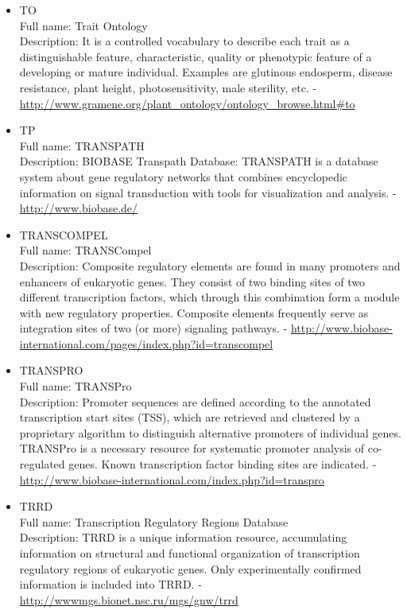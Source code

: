 \begin{itemize}
\item{TO}\\ Full name: Trait Ontology\\ Description: It is a controlled vocabulary to describe each trait as a distinguishable feature, characteristic, quality or phenotypic feature of a developing or mature individual. Examples are glutinous endosperm, disease resistance, plant height, photosensitivity, male sterility, etc. - 
\url{http://www.gramene.org/plant\_ontology/ontology\_browse.html#to}

\item{TP}\\ Full name: TRANSPATH\\ Description: BIOBASE Transpath Database: TRANSPATH is a database system about gene regulatory networks that combines encyclopedic information on signal transduction with tools for visualization and analysis. - 
\url{http://www.biobase.de/}

\item{TRANSCOMPEL}\\ Full name: TRANSCompel\\ Description: Composite regulatory elements are found in many promoters and enhancers of eukaryotic genes. They consist of two binding sites of two different transcription factors, which through this combination form a module with new regulatory properties. Composite elements frequently serve as integration sites of two (or more) signaling pathways. - 
\url{http://www.biobase-international.com/pages/index.php?id=transcompel}

\item{TRANSPRO}\\ Full name: TRANSPro\\ Description: Promoter sequences are defined according to the annotated transcription start sites (TSS), which are retrieved and clustered by a proprietary algorithm to distinguish alternative promoters of individual genes. TRANSPro is a necessary resource for systematic promoter analysis of co-regulated genes. Known transcription factor binding sites are indicated. - 
\url{http://www.biobase-international.com/index.php?id=transpro}

\item{TRRD}\\ Full name: Transcription Regulatory Regions Database\\ Description: TRRD is a unique information resource, accumulating information on structural and functional organization of transcription regulatory regions of eukaryotic genes. Only experimentally confirmed information is included into TRRD. - 
\url{http://wwwmgs.bionet.nsc.ru/mgs/gnw/trrd}


\end{itemize}
